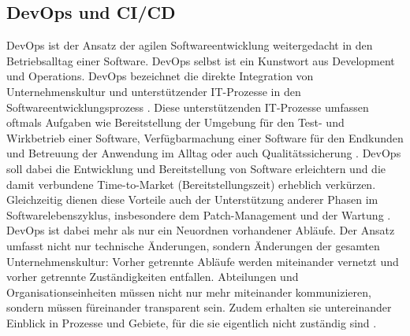 \subsection{DevOps und CI/CD}
\label{DevOps und CI/CD}
\gls{DevOps} ist der Ansatz der agilen Softwareentwicklung weitergedacht in den Betriebsalltag einer Software. \gls{DevOps} selbst ist ein Kunstwort aus \glqq{}Development\grqq{} und \glqq{}Operations\grqq{}. \gls{DevOps} bezeichnet die direkte Integration von Unternehmenskultur und unterstützender \acrshort{IT}-Prozesse in den Softwareentwicklungsprozess \cite{halstenberg_devops_2020}. Diese unterstützenden \acrshort{IT}-Prozesse umfassen oftmals Aufgaben wie Bereitstellung der Umgebung für den Test- und Wirkbetrieb einer Software, Verfügbarmachung einer Software für den Endkunden und Betreuung der Anwendung im Alltag oder auch Qualitätssicherung \cite{DevOps_Definition_AWS}. \acrshort{DevOps} soll dabei die Entwicklung und Bereitstellung von Software erleichtern und die damit verbundene Time-to-Market (Bereitstellungszeit) erheblich verkürzen. Gleichzeitig dienen diese Vorteile auch der Unterstützung anderer Phasen im Softwarelebenszyklus, insbesondere dem Patch-Management und der Wartung \cite{DevOps_Definition_Microsoft}.\newline
\gls{DevOps} ist dabei mehr als nur ein Neuordnen vorhandener Abläufe. Der Ansatz umfasst nicht nur technische Änderungen, sondern Änderungen der gesamten Unternehmenskultur: Vorher getrennte Abläufe werden miteinander vernetzt und vorher getrennte Zuständigkeiten entfallen. Abteilungen und Organisationseinheiten müssen nicht nur mehr miteinander kommunizieren, sondern müssen füreinander transparent sein. Zudem erhalten sie untereinander Einblick in Prozesse und Gebiete, für die sie eigentlich nicht zuständig sind \cite{DevOps_Definition_Microsoft} \cite{DevOps_Definition_AWS}.\newline
